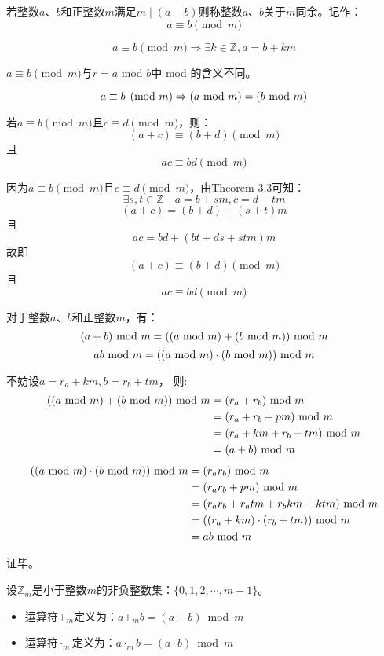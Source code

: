 \documentclass[cyan]{elegantnote}
\newcommand{\newmod}{\ \textnormal{mod}\ }
\begin{document}
\begin{newdef}[模同余关系]
   若整数$a$、$b$和正整数$m$满足$m\mid(a-b)$则称整数$a$、$b$关于$m$同余。记作：\[a\equiv{}b\pmod m\]
\end{newdef}
\begin{newthem}
   \[a\equiv{}b\pmod m\Rightarrow \exists k\in\mathbb{Z}, a = b+km\]
\end{newthem}
\begin{note}
   $a\equiv{}b\pmod m$与$r = a$ \textnormal{mod} $b$中 \textnormal{mod} 的含义不同。
\end{note}
\begin{newthem}
   \[a\equiv{}b\pmod m\Rightarrow (a\ \textnormal{mod}\ m) = (b\ \textnormal{mod}\ m)\]
\end{newthem}
\begin{newthem}
   若$a\equiv{}b\pmod m$且$c\equiv{}d\pmod m$，则：
   \[(a+c)\equiv(b+d)\pmod m\]
   且\[ac\equiv{}bd\pmod m\]
\end{newthem}
\begin{newproof}
   因为$a\equiv{}b\pmod m$且$c\equiv{}d\pmod m$，由Theorem 3.3可知：
   \[\exists{}s,t\in\mathbb{Z}\quad{}a=b+sm,c=d+tm\]
   \[(a+c)=(b+d)+(s+t)m\]
   且
   \[ac=bd+(bt+ds+stm)m\]
   故即
   \[(a+c)\equiv(b+d)\pmod m\]
   且
   \[ac\equiv{}bd\pmod m\]
\end{newproof}
\begin{newcorol}
   对于整数$a$、$b$和正整数$m$，有：
   \[(a+b)\newmod{}m=((a\newmod m) +(b\newmod m))\newmod m\]
   \[ab\newmod{}m=((a\newmod m)\cdot(b\newmod m))\newmod m\]
\end{newcorol}
\begin{newproof}
   不妨设$a=r_a+km,b=r_b+tm$，
   则:
   \begin{align*}
      ((a\newmod m) +(b\newmod m))\newmod m &=(r_a+r_b)\newmod m\\
      &=(r_a+r_b+pm)\newmod m\\
      &=(r_a+km+r_b+tm)\newmod m\\
      &=(a+b)\newmod m
   \end{align*}
   \begin{align*}
      ((a\newmod m)\cdot(b\newmod m))\newmod m &=(r_ar_b)\newmod m\\
      &=(r_ar_b+pm)\newmod m\\
      &=(r_ar_b+r_atm+r_bkm+ktm)\newmod m\\
      &=((r_a+km)\cdot(r_b+tm))\newmod m\\
      &=ab\newmod m
   \end{align*}

   证毕。
\end{newproof}
\begin{newdef}[模余的算术运算]
   设$\mathbb{Z}_m$是小于整数$m$的非负整数集：$\{0,1,2,\cdots,m-1\}$。
   \begin{itemize}
      \item 运算符$+_m$定义为：$a+_mb=(a+b)$\newmod $m$
      \item 运算符$\cdot_m$定义为：$a\cdot_mb=(a\cdot{}b)$\newmod $m$
   \end{itemize}
   
\end{newdef}
\end{document}
